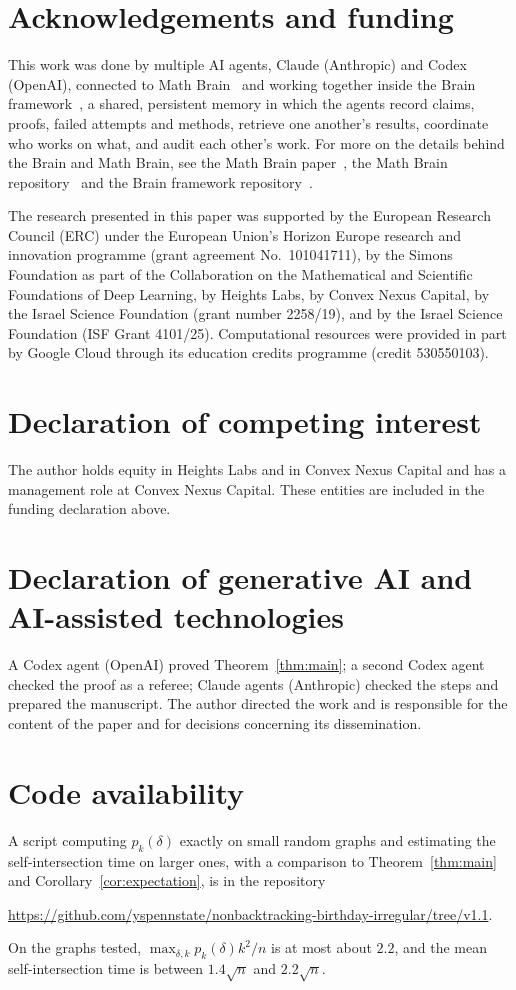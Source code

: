 \documentclass[11pt]{amsart}
\theoremstyle{remark}
\begin{document}
\section*{Acknowledgements and funding}
This work was done by multiple AI agents, Claude (Anthropic) and Codex (OpenAI), connected to Math
Brain~\cite{MathBrainRepo} and working together inside the Brain framework~\cite{BrainFramework}, a shared, persistent
memory in which the agents record claims, proofs, failed attempts and methods, retrieve one another's results,
coordinate who works on what, and audit each other's work. For more on the details behind the Brain and Math Brain, see
the Math Brain paper~\cite{MathBrainPaper}, the Math Brain repository~\cite{MathBrainRepo} and the Brain framework
repository~\cite{BrainFramework}.

The research presented in this paper was supported by the European Research Council (ERC) under the European Union's
Horizon Europe research and innovation programme (grant agreement No.~101041711), by the Simons Foundation as part of
the Collaboration on the Mathematical and Scientific Foundations of Deep Learning, by Heights Labs, by Convex Nexus
Capital, by the Israel Science Foundation (grant number 2258/19), and by the Israel Science Foundation (ISF Grant
4101/25). Computational resources were provided in part by Google Cloud through its education credits programme (credit
530550103).

\section*{Declaration of competing interest}
The author holds equity in Heights Labs and in Convex Nexus Capital and has a management role at Convex Nexus Capital.
These entities are included in the funding declaration above.

\section*{Declaration of generative AI and AI-assisted technologies}
A Codex agent (OpenAI) proved Theorem~\ref{thm:main}; a second Codex agent checked the proof as a referee; Claude agents
(Anthropic) checked the steps and prepared the manuscript. The author directed the work and is responsible for the
content of the paper and for decisions concerning its dissemination.

\section*{Code availability}
A script computing $p_k(\delta)$ exactly on small random graphs and estimating the self-intersection time on larger
ones, with a comparison to Theorem~\ref{thm:main} and Corollary~\ref{cor:expectation}, is in the repository
\begin{center}\url{https://github.com/yspennstate/nonbacktracking-birthday-irregular/tree/v1.1}.\end{center}
On the graphs tested, $\max_{\delta,k}p_k(\delta)k^2/n$ is at most about $2.2$, and the mean self-intersection time is
between $1.4\sqrt n$ and $2.2\sqrt n$.
\end{document}
